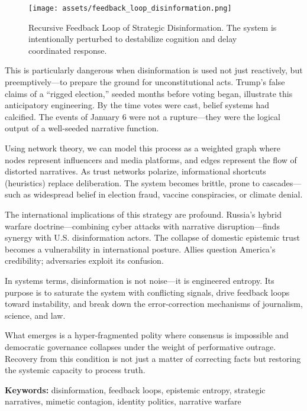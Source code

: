 \begin{figure}[H]
\centering
\texttt{[image: assets/feedback\_loop\_disinformation.png]}
\caption{Recursive Feedback Loop of Strategic Disinformation. The system is intentionally perturbed to destabilize cognition and delay coordinated response.}
\end{figure}

This is particularly dangerous when disinformation is used not just
reactively, but preemptively---to prepare the ground for
unconstitutional acts. Trump's false claims of a ``rigged election,''
seeded months before voting began, illustrate this anticipatory
engineering. By the time votes were cast, belief systems had calcified.
The events of January 6 were not a rupture---they were the logical
output of a well-seeded narrative function.

Using network theory, we can model this process as a weighted graph
where nodes represent influencers and media platforms, and edges
represent the flow of distorted narratives. As trust networks polarize,
informational shortcuts (heuristics) replace deliberation. The system
becomes brittle, prone to cascades---such as widespread belief in
election fraud, vaccine conspiracies, or climate denial.

The international implications of this strategy are profound. Russia's
hybrid warfare doctrine---combining cyber attacks with narrative
disruption---finds synergy with U.S. disinformation actors. The collapse
of domestic epistemic trust becomes a vulnerability in international
posture. Allies question America's credibility; adversaries exploit its
confusion.

In systems terms, disinformation is not noise---it is engineered
entropy. Its purpose is to saturate the system with conflicting signals,
drive feedback loops toward instability, and break down the
error-correction mechanisms of journalism, science, and law.

What emerges is a hyper-fragmented polity where consensus is impossible
and democratic governance collapses under the weight of performative
outrage. Recovery from this condition is not just a matter of correcting
facts but restoring the systemic capacity to process truth.

\noindent\textbf{Keywords:} disinformation, feedback loops, epistemic
entropy, strategic narratives, mimetic contagion, identity politics,
narrative warfare


